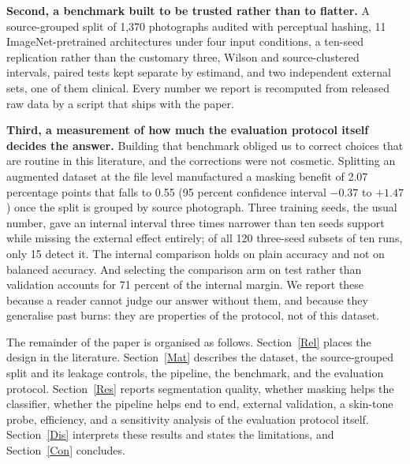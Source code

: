 \documentclass{melba}
\begin{document}
\textbf{Second, a benchmark built to be trusted rather than to flatter.} A source-grouped split of 1{,}370 photographs audited with perceptual hashing, 11 ImageNet-pretrained architectures under four input conditions, a ten-seed replication rather than the customary three, Wilson and source-clustered intervals, paired tests kept separate by estimand, and two independent external sets, one of them clinical. Every number we report is recomputed from released raw data by a script that ships with the paper.

\textbf{Third, a measurement of how much the evaluation protocol itself decides the answer.} Building that benchmark obliged us to correct choices that are routine in this literature, and the corrections were not cosmetic. Splitting an augmented dataset at the file level manufactured a masking benefit of 2.07 percentage points that falls to 0.55 (95 percent confidence interval $-0.37$ to $+1.47$) once the split is grouped by source photograph. Three training seeds, the usual number, gave an internal interval three times narrower than ten seeds support while missing the external effect entirely; of all 120 three-seed subsets of ten runs, only 15 detect it. The internal comparison holds on plain accuracy and not on balanced accuracy. And selecting the comparison arm on test rather than validation accounts for 71 percent of the internal margin. We report these because a reader cannot judge our answer without them, and because they generalise past burns: they are properties of the protocol, not of this dataset.

The remainder of the paper is organised as follows. Section~\ref{Rel} places the design in the literature. Section~\ref{Mat} describes the dataset, the source-grouped split and its leakage controls, the pipeline, the benchmark, and the evaluation protocol. Section~\ref{Res} reports segmentation quality, whether masking helps the classifier, whether the pipeline helps end to end, external validation, a skin-tone probe, efficiency, and a sensitivity analysis of the evaluation protocol itself. Section~\ref{Dis} interprets these results and states the limitations, and Section~\ref{Con} concludes.
\end{document}
